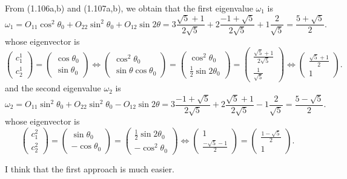 \documentclass[a4paper]{book}
\newcounter{solution}[chapter]
\begin{document}
\begin{solution}
\begin{itemize}
	From (1.106a,b) and (1.107a,b), we obtain that the first eigenvalue $\omega_1$ is
	\[
		\omega_1 = O_{11} \cos^2 \theta_0 + O_{22} \sin^2 \theta_0 + O_{12} \sin 2\theta = 3 \frac{ \sqrt{5} + 1 }{ 2\sqrt{5} } + 2 \frac{ -1 + \sqrt{5} }{ 2\sqrt{5} } + 1 \frac{ 2 }{ \sqrt{5} } = \frac{ 5 + \sqrt{5} }{2} .
	\]
	whose eigenvector is
	\[
		\begin{pmatrix}
			c^1_1 \\ c^1_2 
		\end{pmatrix} = \begin{pmatrix}
			\cos \theta_0 \\ \sin \theta_0
		\end{pmatrix} \Leftrightarrow \begin{pmatrix}
			\cos^2 \theta_0 \\ \sin \theta \cos \theta_0
		\end{pmatrix} = \begin{pmatrix}
			\cos^2 \theta_0 \\ \frac{1}{2}\sin 2\theta_0
		\end{pmatrix} = \begin{pmatrix}
			\frac{ \sqrt{5} + 1 }{ 2\sqrt{5} } \\ \frac{ 1 }{ \sqrt{5} }
		\end{pmatrix} \Leftrightarrow \begin{pmatrix}
			\frac{ \sqrt{5} + 1 }{ 2 } \\ 1
		\end{pmatrix} .
	\]
	and the second eigenvalue $\omega_2$ is
	\[
		\omega_2 = O_{11} \sin^2 \theta_0 + O_{22} \sin^2 \theta_0 - O_{12} \sin 2\theta = 3 \frac{ -1 + \sqrt{5} }{ 2\sqrt{5} } + 2 \frac{ \sqrt{5} + 1 }{ 2\sqrt{5} } - 1 \frac{ 2 }{ \sqrt{5} } = \frac{ 5 - \sqrt{5} }{ 2 } .
	\]
	whose eigenvector is
	\[
		\begin{pmatrix}
			c^2_1 \\ c^2_2 
		\end{pmatrix} = \begin{pmatrix}
			\sin \theta_0 \\ -\cos \theta_0
		\end{pmatrix} = \begin{pmatrix}
			\frac{1}{2} \sin 2\theta_0 \\ -\cos^2 \theta_0
		\end{pmatrix} \Leftrightarrow  \begin{pmatrix}
			1 \\ \frac{ -\sqrt{5} - 1 }{ 2 }
		\end{pmatrix} = \begin{pmatrix}
			\frac{ 1 - \sqrt{5} }{ 2 } \\ 1 
		\end{pmatrix} .
	\]
	
	\end{itemize}
	
	I think that the first approach is much easier.
	
	\end{solution}	
\end{document}
